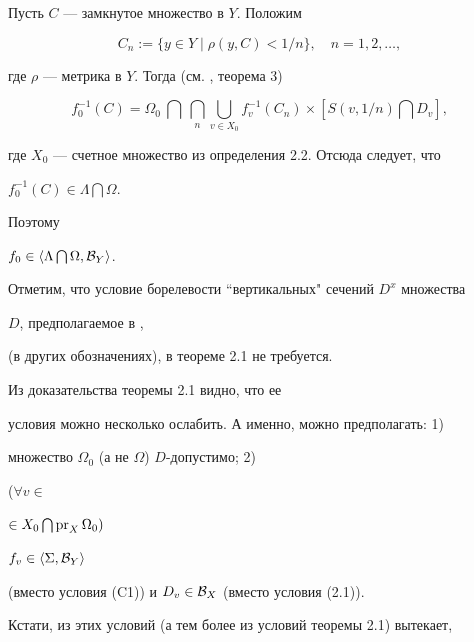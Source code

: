 \begin{pf} Пусть $C$ --- замкнутое множество в $Y$. Положим


$$


C_n := \{y\in Y\mid \rho(y,C)<1/n\},\quad n=1,2,\dotsc,


$$


где $\rho$ --- метрика в $Y$. Тогда (см. \cite{Sh2}, теорема 3)


$$


f_0^{-1}(C)=\Omega_0 \: \bigcap \: \bigcap_n\bigcup_{v\in X_0}


f_v^{-1}(C_n)\times [S(v,1/n)\bigcap D_v],


$$


где $X_0$ --- счетное множество из определения 2.2. Отсюда следует, что


$f_0^{-1}(C)\in\Lambda\bigcap\Omega$.


Поэтому


$f_0\in\langle \Lambda\bigcap\Omega ,{\cal B}_Y\rangle$.


\end{pf}





Отметим, что условие борелевости ``вертикальных" сечений $D^x$ множества


$D$, предполагаемое в \cite{Sh1}, \cite{Sh2}


(в других обозначениях), в теореме 2.1 не требуется.





\begin{notes} Из доказательства теоремы 2.1 видно, что ее


условия можно несколько ослабить. А именно, можно предполагать: 1)


множество $\Omega_0$ (а не $\Omega$) $D$-допустимо; 2)


($\forall v\in$\linebreak




$\in X_0\bigcap\operatorname{pr}_X\Omega_0)$ \;


$f_v\in\langle \Sigma,{\cal B}_Y\rangle$


(вместо условия (C1)) и $D_v\in{\cal B}_X$ (вместо условия (2.1)).


\end{notes}





Кстати, из этих условий (а тем более из условий теоремы 2.1) вытекает,


